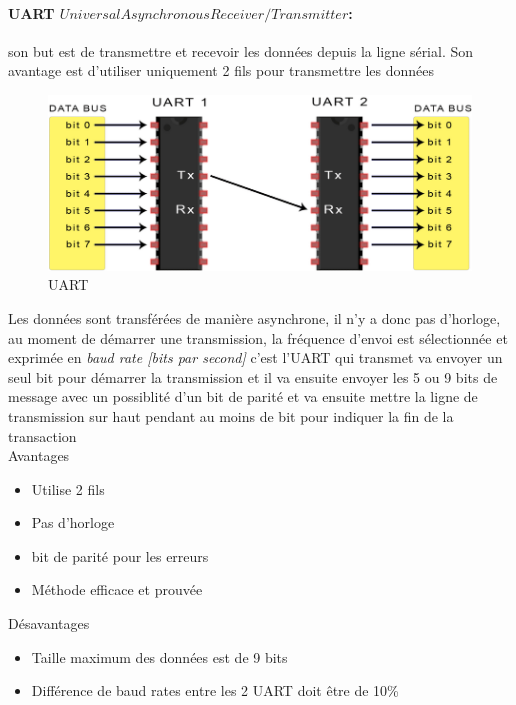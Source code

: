 \paragraph{UART \(Universal Asynchronous Receiver/Transmitter\):} son but est de transmettre et recevoir les données depuis la ligne sérial. Son avantage est d'utiliser uniquement 2 fils pour transmettre les données\\
\begin{figure}[h!]
   \centering
   \includegraphics[width=.5\textwidth]{images/uart.png}
   \caption{UART}
\end{figure}

Les données sont transférées de manière asynchrone, il n'y a donc pas d'horloge, au moment de démarrer une transmission, la fréquence d'envoi est sélectionnée et exprimée en \textit{baud rate [bits par second]} c'est l'UART qui transmet va envoyer un seul bit pour démarrer la transmission et il va ensuite envoyer les 5 ou 9 bits de message avec un possiblité d'un bit de parité et va ensuite mettre la ligne de transmission sur haut pendant au moins de bit pour indiquer la fin de la transaction\\

Avantages
\begin{itemize}
   \item Utilise 2 fils
   \item Pas d'horloge
   \item bit de parité pour les erreurs
   \item Méthode efficace et prouvée
\end{itemize}

Désavantages
\begin{itemize}
   \item Taille maximum des données est de 9 bits
   \item Différence de baud rates entre les 2 UART doit être de 10\% 
\end{itemize}
 
